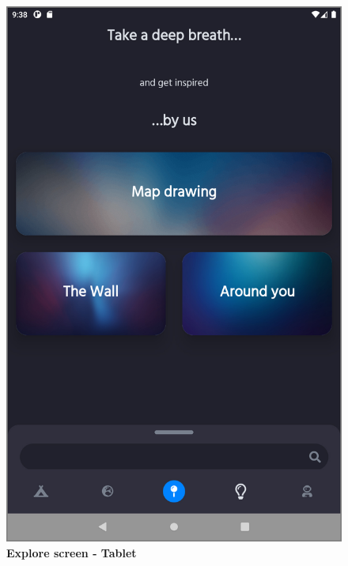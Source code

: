 \begin{figure}[!htb]
\centering
\begin{minipage}{.45\textwidth}
\centering
\includegraphics[width=.95\textwidth]{../Images/UI/ExploreBig.jpg}
\caption{\label{fig:dbapiuser}\textbf{Explore screen - Tablet}}
\end{minipage} 
\begin{minipage}{.45\textwidth}
\centering

\end{minipage}
\end{figure}
